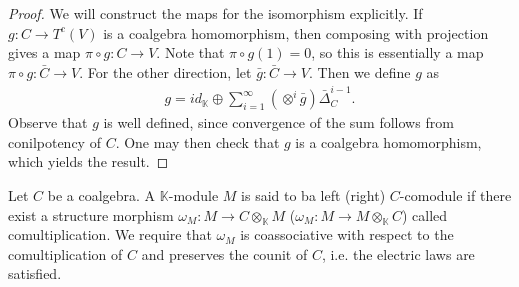 \documentclass[../../thesis.tex]{subfiles}
\begin{document}
\begin{proposition}
\begin{proof}
                We will construct the maps for the isomorphism explicitly. If $g:C\rightarrow T^c(V)$ is a coalgebra homomorphism, then composing with projection gives a map $\pi\circ g:C\rightarrow V$. Note that $\pi\circ g(1)=0$, so this is essentially a map $\pi\circ g:\bar{C}\rightarrow V$. For the other direction, let $\bar{g}:\bar{C}\rightarrow V$. Then we define $g$ as
                \begin{align*}
                    g = id_{\mathbb{K}} \oplus \sum_{i=1}^{\infty}(\otimes^{i}\bar{g})\bar{\Delta}_C^{i-1}.
                \end{align*}
                Observe that $g$ is well defined, since convergence of the sum follows from conilpotency of $C$. One may then check that $g$ is a coalgebra homomorphism, which yields the result.
            \end{proof}

            \begin{definition}[Comodules]
                Let $C$ be a coalgebra. A $\mathbb{K}$-module $M$ is said to ba left (right) $C$-comodule if there exist a structure morphism $\omega_M: M \rightarrow C\otimes_{\mathbb{K}}M$ ($\omega_M: M \rightarrow M\otimes_{\mathbb{K}}C$) called comultiplication. We require that $\omega_M$ is coassociative with respect to the comultiplication of $C$ and preserves the counit of $C$, i.e. the electric laws are satisfied.
                \begin{center}
\end{center}
\end{definition}
\end{proposition}
\end{document}
